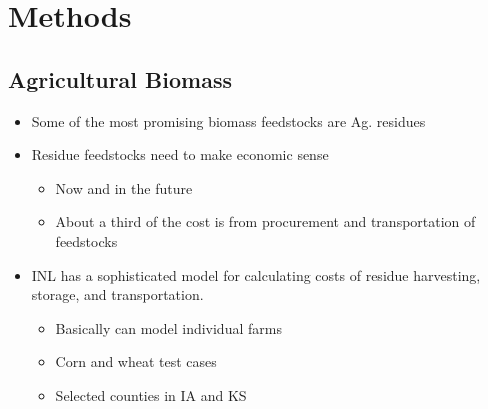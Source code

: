 \documentclass{elsart}
\begin{document}



\section{Methods}
\label{sec:methods}

\subsection{Agricultural Biomass}
  \begin{itemize}
  \item Some of the most promising biomass feedstocks are Ag. residues
  \item Residue feedstocks need to make economic sense
    \begin{itemize}
    \item Now and in the future
    \item About a third of the cost is from procurement and transportation
      of feedstocks
    \end{itemize}
  \item INL has a sophisticated model for calculating costs of residue
    harvesting, storage, and transportation.
    \begin{itemize}
    \item Basically can model individual farms
    \item Corn and wheat test cases
    \item Selected counties in IA and KS 
    \end{itemize}
  \end{itemize}
\end{document}
